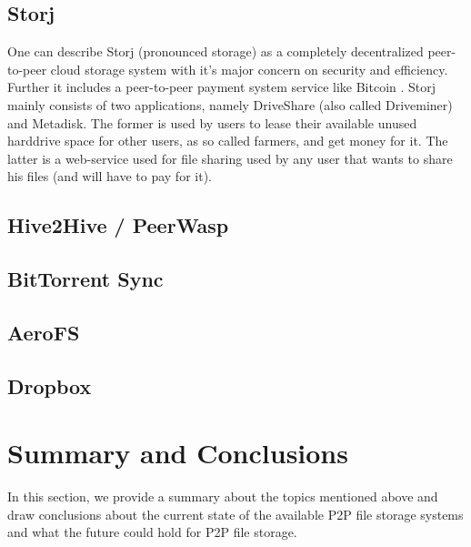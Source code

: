 \subsection{Storj} %
One can describe Storj (pronounced storage) as a completely decentralized peer-to-peer
cloud storage system with it's major concern on security and efficiency. Further
it includes a peer-to-peer payment system service like Bitcoin \cite{blog:what_is_storj}.
Storj mainly consists of two applications, namely DriveShare (also called Driveminer)
and Metadisk. The former is used by users to lease their available unused harddrive
space for other users, as so called farmers, and get money for it. The latter is a
web-service used for file sharing used by any user that wants to share his files
(and will have to pay for it).


\subsection{Hive2Hive / PeerWasp} %

\subsection{BitTorrent Sync} %

\subsection{AeroFS} %

\subsection{Dropbox} %

\section{Summary and Conclusions} In this section, we provide a summary about
the topics mentioned above and draw conclusions about the current state of the
available P2P file storage systems and what the future could hold for P2P file
storage.

